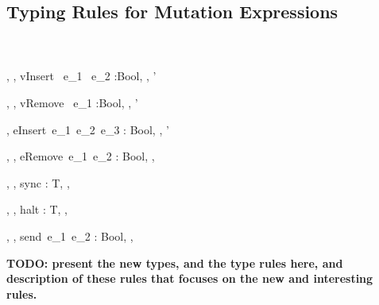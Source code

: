  \subsection{Typing Rules for Mutation Expressions}
\label{subsec:standardRules}
\ \\
\ \\
    {\Gamma, \Lambda, \Delta \vdash vInsert \ e_1 \ e_2 :Bool, \Lambda, \Delta'}
    
    {\Gamma, \Lambda, \Delta \vdash vRemove \ e_1 :Bool, \Lambda, \Delta'}
    
    {\Gamma, \Lambda \Delta \vdash eInsert\ e_1\ e_2\ e_3 : Bool, \Lambda, \Delta'}

    {\Gamma, \Lambda, \Delta \vdash eRemove\ e_1\ e_2 : Bool, \Lambda, \Delta}
        
    {\Gamma, \Lambda, \Delta \vdash sync : T, \Lambda, \Delta}
    
    {\Gamma, \Lambda, \Delta \vdash halt : T, \Lambda, \Delta}
    
    {\Gamma, \Lambda, \Delta \vdash send\ e_1\ e_2 : Bool, \Lambda, \Delta}

{\bf TODO: present the new types, and the type rules here, and description of 
these rules that focuses on the new and interesting rules.}

